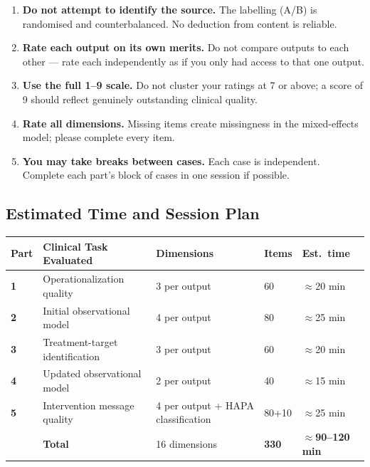 \documentclass[11pt,a4paper]{article}
\renewcommand{\arraystretch}{1.30}
\begin{document}
\begin{instrbox}[title=Critical blinding instructions]
\begin{enumerate}
\item \textbf{Do not attempt to identify the source.} The labelling (A/B) is randomised and counterbalanced. No deduction from content is reliable.
\item \textbf{Rate each output on its own merits.} Do not compare outputs to each other --- rate each independently as if you only had access to that one output.
\item \textbf{Use the full 1--9 scale.} Do not cluster your ratings at 7 or above; a score of 9 should reflect genuinely outstanding clinical quality.
\item \textbf{Rate all dimensions.} Missing items create missingness in the mixed-effects model; please complete every item.
\item \textbf{You may take breaks between cases.} Each case is independent. Complete each part's block of cases in one session if possible.
\end{enumerate}
\end{instrbox}

\subsection{Estimated Time and Session Plan}

\begin{center}
\small\renewcommand{\arraystretch}{1.40}
\begin{tabular}{@{}>{\bfseries}p{}p{}p{}p{}p{}@{}}
\toprule
\textbf{Part} & \textbf{Clinical Task Evaluated} & \textbf{Dimensions} & \textbf{Items} & \textbf{Est.\ time} \\
\midrule
1 & Operationalization quality    & 3 per output & 60 & $\approx$20 min \\
2 & Initial observational model   & 4 per output & 80 & $\approx$25 min \\
3 & Treatment-target identification & 3 per output & 60 & $\approx$20 min \\
4 & Updated observational model   & 2 per output & 40 & $\approx$15 min \\
5 & Intervention message quality  & 4 per output + HAPA classification & 80+10 & $\approx$25 min \\
\midrule
  & \textbf{Total} & 16 dimensions & \textbf{330} & \textbf{$\approx$90--120 min} \\
\bottomrule
\end{tabular}
\end{center}
\end{document}
